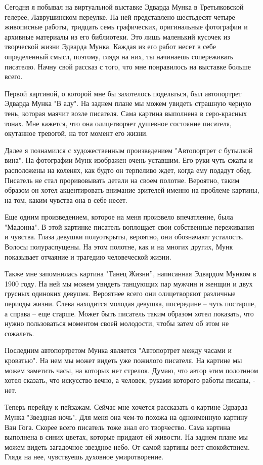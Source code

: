 \documentclass[a4paper, 12pt]{article}
\begin{document}
Сегодня я побывал на виртуальной выставке Эдварда Мунка в Третьяковской гелерее, Лаврушинском переулке. На ней представлено шестьдесят четыре живописные работы, тридцать семь графических, оригинальные фотографии и архивные материалы из его библиотеки. Это лишь маленький кусочек из творческой жизни Эдварда Мунка. Каждая из его работ несет в себе определенный смысл, поэтому, глядя на них, ты начинаешь сопереживать писателю. Начну свой рассказ с того, что мне понравилось на выставке больше всего.

Первой картиной, о которой мне бы захотелось подельться, был автопортрет Эдварда Мунка "В аду". На заднем плане мы можем увидеть страшную черную тень, которая маячит возле писателя. Сама картина выполнена в серо-красных тонах. Мне кажется, что она олицетворяет душевное состояние писателя, окутанное тревогой, на тот момент его жизни. 

Далее я познамился с художественным произведением "Автопортрет с бутылкой вина". На фотографии Мунк изображен очень уставшим. Его руки чуть сжаты и расположены на коленях, как будто он терпеливо ждет, когда ему подадут обед. Писатель не стал проривовывать детали на своем полотне. Вероятно, таким образом он хотел акцентировать внимание зрителей именно на проблеме картины, на том, каким чувства она в себе несет.

Еще одним произведением, которое на меня произвело впечатление, была "Мадонна". В этой картинке писатель воплощает свои собственные переживания и чувства. Глаза девушки полуоткрыты, вероятно, они обозначают усталость. Волосы полураспущены. На этом полотне, как и на многих других, Мунк показывает отчаяние и трагедию человеческой жизни.

Также мне запомнилась картина "Танец Жизни'', написанная Эдвардом Мунком в 1900 году.
 На ней мы можем увидеть танцующих пар мужчин и женщин и двух грусных одиноких девушек. Вероятнее всего они олицетворяют различные периоды жизни. Слева находится молодая девушка, посередине – чуть постарше, а справа – еще старше. Может быть писатель таким образом хотел показать, что нужно пользоваться моментом своей молодости, чтобы затем об этом не сожалеть.

Последним автопортретом Мунка является "Автопортрет между часами и кроватью". На нем мы может видеть уже пожилого писателя. На картине мы можем заметить часы, на которых нет стрелок. Думаю, что автор этим полотнном хотел сказать, что искусство вечно, а человек, руками которого работы писаны, - нет. 

Теперь перейду к пейзажам.
Сейчас мне хочется рассказать о картине Эдварда Мунка "Звездная ночь". Для меня она чем-то похожа на одноименную картину Ван Гога. Скорее всего писатель тоже знал его творчество. Сама картина выполнена в синих цветах, которые придают ей живости. На заднем плане мы можем видеть загадочное звездное небо. От самой картины веет спокойствием. Глядя на нее, чувствуешь духовное умиротворение.
\end{document}
